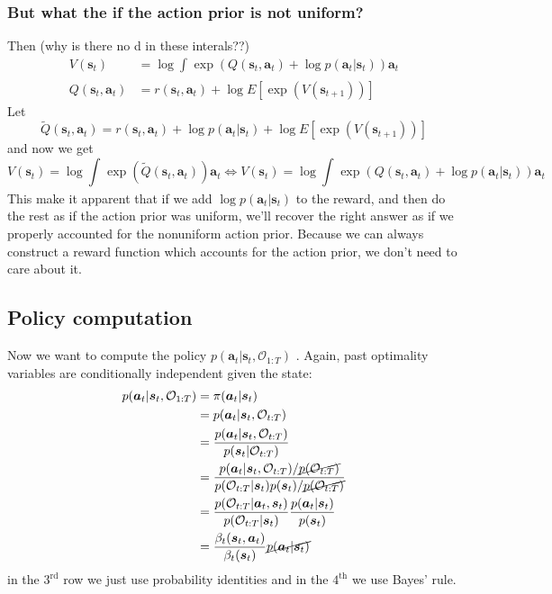 \documentclass{report}
\begin{document}
\subsubsection{But what the if the action prior is not uniform?}
Then  (why is there no d in these interals??)
\begin{align}
		V (\bm{s}_{t}) &= \log 
		\int_{}^{} \exp (Q (\bm{s}_{t}, \bm{a}_{t} ) + \log p (\bm{a}_{t}| \bm{s}_{t} ) ) \bm{a}_{t}\\
		Q (\bm{s}_{t}, \bm{a}_{t} ) &= r (\bm{s}_{t}, \bm{a}_{t} ) + \log E \left[ \exp (V (\bm{s}_{t+1})) \right] 
\end{align}
Let 
\begin{equation}
		\tilde{Q} (\bm{s}_{t}, \bm{a}_{t} ) = r (\bm{s}_{t}, \bm{a}_{t} ) + \log p (\bm{a}_{t}| \bm{s}_{t} ) + \log E \left[ \exp (V (\bm{s}_{t+1})) \right] 
\end{equation}
and now we get
\begin{equation}
		V (\bm{s}_{t}) = \log \int_{}^{} \exp (\tilde{Q} (\bm{s}_{t}, \bm{a}_{t} )) \bm{a}_{t}
		\iff 
		V (\bm{s}_{t}) = \log \int_{}^{} \exp (Q (\bm{s}_{t}, \bm{a}_{t} ) + \log p (\bm{a}_{t}| \bm{s}_{t} ) ) \bm{a}_{t}
\end{equation}
This make it apparent that if we add $ \log p (\bm{a}_{t}| \bm{s}_{t} )  $ to the reward,
and then do the rest as if the action prior was uniform,
we'll recover the right answer as if we properly accounted for the nonuniform action prior.
Because we can always construct a reward function which accounts for the action prior, we don't 
need to care about it.

\subsection{Policy computation}
Now we want to compute the policy $ p (\bm{a}_{t}| \bm{s}_{t}, \mathcal{O}_{ 1:T } )  $ .
Again, past optimality variables are conditionally independent given the state:
\begin{align}
p (\bm{a}_{t}| \bm{s}_{t}, \mathcal{O}_{ 1:T } ) &= \pi (\bm{a}_{t}| \bm{s}_{t} ) \\
&= p (\bm{a}_{t}| \bm{s}_{t}, \mathcal{O}_{ t:T } ) \\
&= \frac{p (\bm{a}_{t}| \bm{s}_{t}, \mathcal{O}_{ t:T } )}{p (\bm{s}_{t}| \mathcal{O}_{ t:T })} \\
&= \frac{p (\bm{a}_{t}| \bm{s}_{t}, \mathcal{O}_{ t:T } )/ \cancel{p (\mathcal{O}_{ t:T })}}{p (\mathcal{O}_{ t:T }|\bm{s}_{t}) p (\bm{s}_{t}) / \cancel{p (\mathcal{O}_{ t:T }) } }\\
&= \frac{p (\mathcal{O}_{ t:T }|\bm{a}_{t}, \bm{s}_{t})}{p (\mathcal{O}_{ t:T }|\bm{s}_{t})}  \frac{p (\bm{a}_{t}| \bm{s}_{t} )}{p (\bm{s}_{t})} \\
&= \frac{\beta_{ t }(\bm{s}_{t}, \bm{a}_{t} )}{\beta_{ t } (\bm{s}_{t})} \cancel{p (\bm{a}_{t}| \bm{s}_{t} ) }
\end{align}
in the $ 3^{ \text{rd} }  $ row we just use probability identities and in the $ 4^{ \text{th} }  $ we use Bayes' rule.
\end{document}

